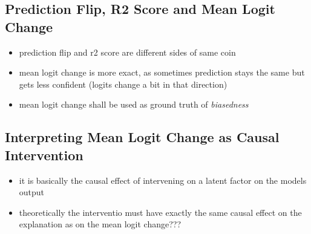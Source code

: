 \subsection{Prediction Flip, R2 Score and Mean Logit Change}
\begin{itemize}
    \item prediction flip and r2 score are different sides of same coin
    \item mean logit change is more exact, as sometimes prediction stays the same but gets less confident (logits change a bit in that direction)
    \item mean logit change shall be used as ground truth of \textit{biasedness}
\end{itemize}

\subsection{Interpreting Mean Logit Change as Causal Intervention}
\begin{itemize}
    \item it is basically the causal effect of intervening on a latent factor on the models output
    \item theoretically the interventio must have exactly the same causal effect on the explanation as on the mean logit change???
\end{itemize}

